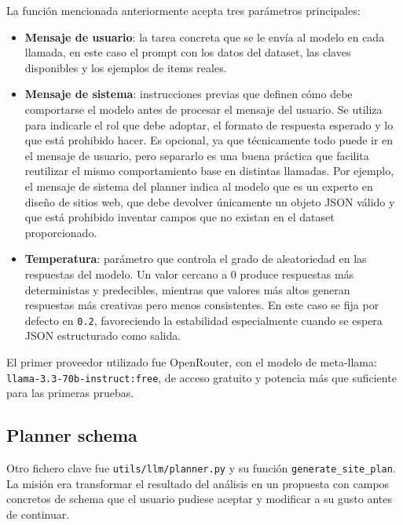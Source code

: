 La función mencionada anteriormente acepta tres parámetros principales:

\begin{itemize}
    \item \textbf{Mensaje de usuario}: la tarea concreta que se le envía al modelo 
    en cada llamada, en este caso el prompt con los datos del dataset, las claves 
    disponibles y los ejemplos de items reales.
    
    \item \textbf{Mensaje de sistema}: instrucciones previas que definen cómo debe 
    comportarse el modelo antes de procesar el mensaje del usuario. Se utiliza para 
    indicarle el rol que debe adoptar, el formato de respuesta esperado y lo que 
    está prohibido hacer. Es opcional, ya que técnicamente todo puede ir en el 
    mensaje de usuario, pero separarlo es una buena práctica que facilita reutilizar 
    el mismo comportamiento base en distintas llamadas. Por ejemplo, el mensaje de sistema del planner indica al modelo que es un experto en diseño 
    de sitios web, que debe devolver únicamente un objeto JSON válido y que está 
    prohibido inventar campos que no existan en el dataset proporcionado.
    
    \item \textbf{Temperatura}: parámetro que controla el grado de aleatoriedad 
    en las respuestas del modelo. Un valor cercano a 0 produce respuestas más 
    deterministas y predecibles, mientras que valores más altos generan respuestas 
    más creativas pero menos consistentes. En este caso se fija por defecto en 
    \texttt{0.2}, favoreciendo la estabilidad especialmente cuando se espera JSON 
    estructurado como salida.
\end{itemize}

El primer proveedor utilizado fue OpenRouter, con el modelo de meta-llama: \\
\texttt{llama-3.3-70b-instruct:free}, de acceso gratuito y potencia más que suficiente para las primeras pruebas.

\subsection{Planner schema}
\label{subsec:planner-schema}

Otro fichero clave fue \texttt{utils/llm/planner.py} y su función \texttt{generate\_site\_plan}. La misión era transformar el resultado del análisis en un propuesta con campos
concretos de schema que el usuario pudiese aceptar y modificar a su gusto antes de continuar.

